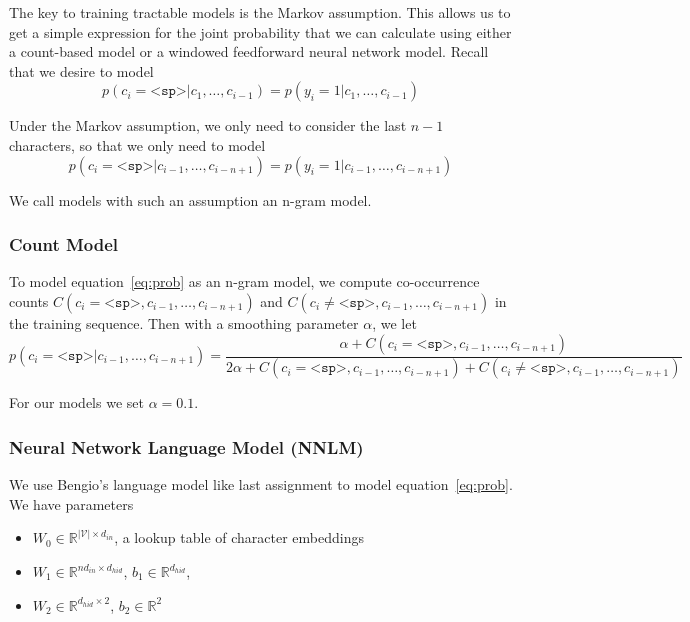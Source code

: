 \documentclass[11pt]{article}
\begin{document}
The key to training tractable models is the Markov assumption. This allows us to get a simple expression for the joint probability that we can calculate using either a count-based model or a windowed feedforward neural network model. Recall that we desire to model
$$p(c_i = \texttt{<sp>} | c_1, \ldots, c_{i-1}) = p(y_i = 1 | c_1, \ldots, c_{i-1})$$

Under the Markov assumption, we only need to consider the last $n-1$ characters, so that we only need to model
\begin{equation}\label{eq:prob}
p(c_i = \texttt{<sp>} | c_{i-1}, \ldots, c_{i-n+1}) = p(y_i = 1 | c_{i-1}, \ldots, c_{i-n+1})
\end{equation}

We call models with such an assumption an n-gram model.

\subsubsection{Count Model}

To model equation~\ref{eq:prob} as an n-gram model, we compute co-occurrence counts $C(c_i = \texttt{<sp>}, c_{i-1}, \ldots, c_{i-n+1})$ and $C(c_i \neq \texttt{<sp>}, c_{i-1}, \ldots, c_{i-n+1})$ in the training sequence. Then with a smoothing parameter $\alpha$, we let
$$p(c_i = \texttt{<sp>} | c_{i-1}, \ldots, c_{i-n+1}) = \frac{\alpha + C(c_i = \texttt{<sp>}, c_{i-1}, \ldots, c_{i-n+1})}{2\alpha + C(c_i = \texttt{<sp>}, c_{i-1}, \ldots, c_{i-n+1}) + C(c_i \neq \texttt{<sp>}, c_{i-1}, \ldots, c_{i-n+1})}$$

For our models we set $\alpha = 0.1$.

\subsubsection{Neural Network Language Model (NNLM)}

We use Bengio's language model like last assignment to model equation~\ref{eq:prob}. We have parameters
\begin{itemize}
  \item $W_0 \in \mathbb{R}^{|\mathcal{V}| \times d_{in}}$, a lookup table of character embeddings
  \item $W_1 \in \mathbb{R}^{nd_{in} \times d_{hid}}$, $b_1 \in \mathbb{R}^{d_{hid}}$,
  \item $W_2 \in \mathbb{R}^{d_{hid} \times 2}$, $b_2 \in \mathbb{R}^{2}$
\end{itemize}
\end{document}
